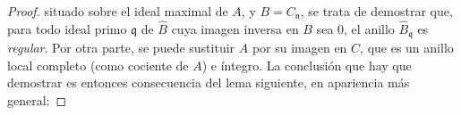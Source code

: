 \begin{proof}

situado sobre el ideal maximal de $A$, y $B=C_{\mathfrak n}$, se trata
de demostrar que, para todo ideal primo $\mathfrak q$ de $\widehat B$
cuya imagen inversa en $B$ sea 0, el anillo
$\widehat B_{\mathfrak q}$ es \emph{regular}. Por otra parte, se puede
sustituir $A$ por su imagen en $C$, que es un anillo local completo
(como cociente de $A$) e íntegro. La conclusión que hay que demostrar
es entonces consecuencia del lema siguiente, en apariencia más general:
\end{proof}
